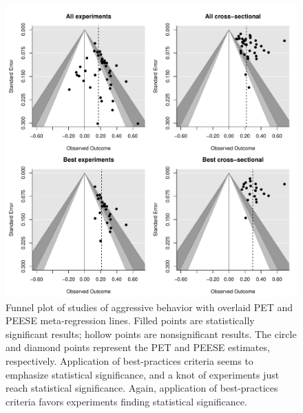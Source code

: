 \documentclass[man, mask]{apa6}
\begin{document}
\begin{figure}
	\includegraphics[width = \textwidth, keepaspectratio]{funnels-0_AggBeh.pdf}
	\caption{Funnel plot of studies of aggressive behavior with overlaid PET and PEESE meta-regression lines. Filled points are statistically significant results; hollow points are nonsignificant results. The circle and diamond points represent the PET and PEESE estimates, respectively. Application of best-practices criteria seems to emphasize statistical significance, and a knot of experiments just reach statistical significance. Again, application of best-practices criteria favors experiments finding statistical significance.}
	\label{funnel-aggbeh}
\end{figure}
\end{document}
